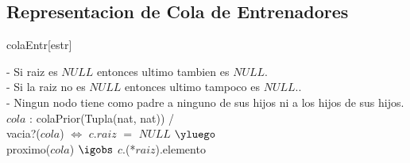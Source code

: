 \begin{Representacion}
 \subsection{Representacion de Cola de Entrenadores}
  \begin{Estructura}{colaEntr}[estr]
      \begin{Tupla}[estr]%
    \end{Tupla}
  \end{Estructura}

	\begin{Tupla}[Nodoheap]
	\end{Tupla}

	\begin{Tupla}[entrenador]
	\end{Tupla}


	
- Si raiz es $NULL$ entonces ultimo tambien es $NULL$. \\
- Si la raiz no es $NULL$ entonces ultimo tampoco es $NULL$.. \\
- Ningun nodo tiene como padre a ninguno de sus hijos ni a los hijos de sus hijos. \\ 


%
{
$cola$ : colaPrior(Tupla(nat, nat)) / \\
	vacia?($cola$)  $\iff$  $c$.$raiz$ $=$ $NULL$ $\yluego$ \\
	proximo($cola$) $\igobs$ $c$.(*$raiz$).elemento \\
	
}%

\end{Representacion}

